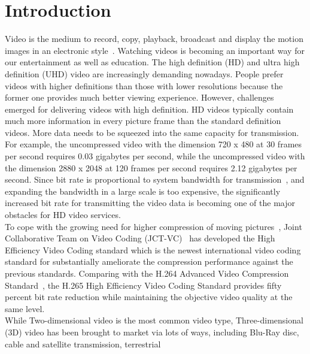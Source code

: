 \chapter{Introduction}\label{ch:chapter1} %

Video is the medium to record, copy, playback, broadcast
and display the motion images in an electronic style~\parencite{RN190}.
Watching videos is becoming an important way for our entertainment as well
as education.
The high definition (HD) and ultra high definition (UHD) video
are increasingly demanding nowadays.
People prefer videos with higher definitions than those with lower
resolutions because the former one provides much better viewing experience.
However, challenges emerged for delivering videos with high definition.
HD videos typically contain much more information in every picture frame than the
standard definition videos.
More data needs to be squeezed into the same capacity for transmission.
For example, the uncompressed video with the dimension 720 x 480 at 30 frames
per second requires 0.03 gigabytes per second, while the uncompressed video with
the dimension 2880 x 2048 at 120 frames per second requires 2.12 gigabytes per
second.
Since bit rate is proportional to system bandwidth for
transmission~\parencite{RN191}, and expanding the bandwidth in a large scale is
too expensive, the significantly increased bit rate
for transmitting the video data is becoming one of the
major obstacles for HD video services.\\
\newline
To cope with the growing need for higher compression of moving
pictures~\parencite{RN193}, Joint Collaborative Team on Video
Coding (JCT-VC)~\parencite{RN192} has developed the High Efficiency Video
Coding standard which is the newest international video coding standard for
substantially ameliorate the compression performance against the previous
standards.
Comparing with the H.264 Advanced Video Compression Standard~\parencite{RN194},
the H.265 High Efficiency Video Coding Standard provides fifty percent bit rate
reduction while maintaining the objective video quality at the same level.\\
\newline
While Two-dimensional video is the most common video type,
Three-dimensional (3D) video has been brought to market via lots of ways,
including Blu-Ray disc, cable and satellite transmission, terrestrial
